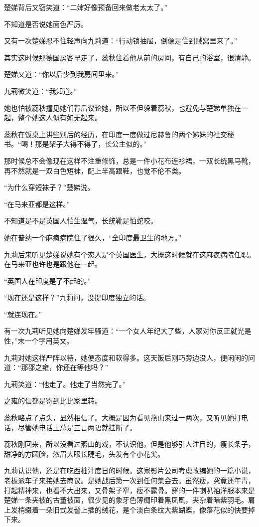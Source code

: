 \par 楚娣背后又窃笑道：“二婶好像预备回来做老太太了。”
\par 不知道是否说她面色严厉。
\par 又有一次楚娣忍不住轻声向九莉道：“行动锁抽屉，倒像是住到贼窝里来了。”
\par 其实这时候那德国房客早走了，蕊秋住着他从前的房间，有自己的浴室，很清静。
\par 楚娣又道：“你以后少到我房间里来。”
\par 九莉微笑道：“我知道。”
\par 她也怕被蕊秋撞见她们背后议论她，所以不但躲着蕊秋，也避免与楚娣单独在一起，整个她这人似有如无起来。
\par 蕊秋在饭桌上讲些别后的经历，在印度一度做过尼赫鲁的两个姊妹的社交秘书。“喝！那是架子大得不得了，长公主似的。”
\par 那时候总不会像现在这样不注重修饰，总是一件小花布连衫裙，一双长统黑马靴，再不然就是一双白色短袜，配上半高跟鞋，也觉不伦不类。
\par “为什么穿短袜子？”楚娣说。
\par “在马来亚都是这样。”
\par 不知道是不是英国人怕生湿气，长统靴是怕蛇咬。
\par 她在普纳一个麻疯病院住了很久，“全印度最卫生的地方。”
\par 九莉后来听见楚娣说她有个恋人是个英国医生，大概这时候就在这麻疯病院任职。在马来亚也许也是跟他在一起。
\par “英国人在印度是了不起的。”
\par “现在还是这样？”九莉问，没提印度独立的话。
\par “就连现在。”
\par 有一次九莉听见她向楚娣发牢骚道：“一个女人年纪大了些，人家对你反正就光是性，”末一个字用英文。
\par 九莉对她这样严阵以待，她便态度和软得多。这天饭后刚巧旁边没人，便闲闲的问道：“那邵之雍，你还在等他吗？”
\par 九莉笑道：“他走了。他走了当然完了。”
\par 之雍的信都是寄到比比家里转。
\par 蕊秋略点了点头，显然相信了。大概是因为看见燕山来过一两次，又听见她打电话，尽管她电话上总是三言两语就挂断了。
\par 蕊秋刚回来，所以没看过燕山的戏，不认识他，但是他够引人注目的，瘦长条子，甜净的方圆脸，浓眉大眼长睫毛，头发有个小花尖。
\par 九莉认识他，还是在吃西柚汁度日的时候。这家影片公司考虑改编她的一篇小说，老板派车子来接她去商议。是她战后第一次到任何集会去。虽然瘦，究竟还年青，打起精神来，也看不大出来，又骨架子窄，瘦不露骨。穿的一件喇叭袖洋服本来是楚娣一条夹被的古董被面，很少见的象牙色薄绸印着黑凤凰，夹杂着暗紫羽毛。肩上发梢缀着一朵旧式发髻上插的绒花，是个淡白条纹大紫蝴蝶，像落花似的快要掉下来。
